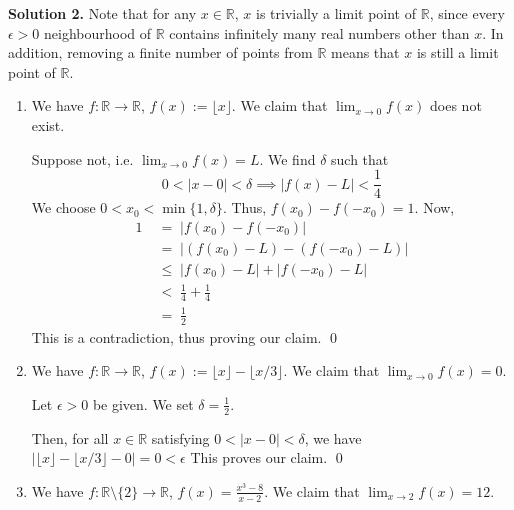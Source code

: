 \documentclass[10pt]{article}
\begin{document}
        \textbf{Solution 2.}
        Note that for any $x \in \mathbb{R}$, $x$ is trivially a limit point of $\mathbb{R}$, since every $\epsilon > 0$ neighbourhood
        of $\mathbb{R}$ contains infinitely many real numbers other than $x$.
        In addition, removing a finite number of points from $\mathbb{R}$ means that $x$ is still a limit point of $\mathbb{R}$.
        \begin{enumerate}
                \item We have $f\colon \mathbb{R} \to \mathbb{R}$, $f(x) := \lfloor x \rfloor$.
                We claim that $\lim_{x \to 0} f(x)$ does not exist.

                Suppose not, i.e. $\lim_{x\to 0} f(x) = L$.
                We find $\delta$ such that
                \[
                0 < |x - 0| < \delta \implies |f(x) - L| < \frac{1}{4}
                \]
                We choose $0 < x_0 < \min\{1, \delta\}$. Thus, $f(x_0) - f(-x_0) = 1$. Now,
                \begin{align*}
                        1 \;&=\; |f(x_0) - f(-x_0)| \\
                                \;&=\; |(f(x_0) - L) - (f(-x_0) - L)| \\
                                \;&\le\; |f(x_0) - L| + |f(-x_0) - L| \\
                                \;&<\; \frac{1}{4} + \frac{1}{4} \\
                                \;&=\; \frac{1}{2}
                \end{align*}
                This is a contradiction, thus proving our claim. \qed
                
                \item We have $f\colon \mathbb{R} \to \mathbb{R}$, $f(x) := \lfloor x\rfloor - \lfloor x/3\rfloor$.
                We claim that $\lim_{x\to 0} f(x) = 0$.

                Let $\epsilon > 0$ be given.
                We set $\delta = \frac{1}{2}$.
 
                Then, for all $x \in \mathbb{R}$ satisfying $0 < |x - 0| < \delta$,
                we have 
                $|\lfloor x\rfloor - \lfloor x/3\rfloor - 0| = 0 < \epsilon$
                This proves our claim. \qed

                \item We have $f\colon \mathbb{R}\setminus\{2\} \to \mathbb{R}$, $f(x) = \frac{x^3 - 8}{x - 2}$.
                We claim that $\lim_{x\to 2} f(x) = 12$.


\end{enumerate}
\end{document}
